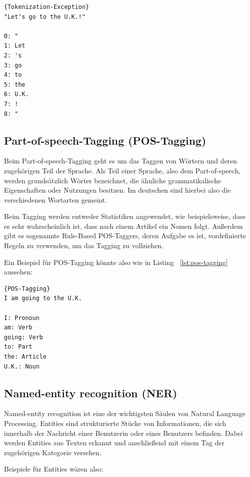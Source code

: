 \begin{lstlisting}[label={lst:tokenization-exception},caption={Ausnahme für bestimmte Tokens}]{Tokenization-Exception}
"Let's go to the U.K.!"

0: "
1: Let
2: 's
3: go
4: to
5: the
6: U.K.
7: !
8: "
\end{lstlisting}

\subsection{Part-of-speech-Tagging (POS-Tagging)}

Beim Part-of-speech-Tagging geht es um das Taggen von Wörtern und deren zugehörigen Teil der Sprache.
Als Teil einer Sprache, also dem Part-of-speech, werden grundsätzlich Wörter bezeichnet, die ähnliche grammatikalische Eigenschaften oder Nutzungen besitzen.
Im deutschen sind hierbei also die verschiedenen Wortarten gemeint.

Beim Tagging werden entweder Statistiken angewendet, wie beispielsweise, dass es sehr wahrscheinlich ist, dass nach einem Artikel ein Nomen folgt.
Außerdem gibt es sogenannte Rule-Based POS-Taggers, deren Aufgabe es ist, vordefinierte Regeln zu verwenden, um das Tagging zu vollziehen.\cite{machineLearningTextAnalysis, naturalLanguageProcessing}

Ein Beispiel für POS-Tagging könnte also wie in Listing ~\ref{lst:pos-tagging} aussehen:

\begin{lstlisting}[label={lst:pos-tagging},caption={Beispiel für POS-Tagging}]{POS-Tagging}
I am going to the U.K.

I: Pronoun
am: Verb
going: Verb
to: Part
the: Article
U.K.: Noun
\end{lstlisting}

\subsection{Named-entity recognition (NER)}

Named-entity recognition ist eine der wichtigsten Säulen von Natural Language Processing.
Entities sind strukturierte Stücke von Informationen, die sich innerhalb der Nachricht einer Benutzerin oder eines Benutzers befinden.
Dabei werden Entities aus Texten erkannt und anschließend mit einem Tag der zugehörigen Kategorie versehen.\cite{namedEntityRecognition}

Beispiele für Entities wären also:

